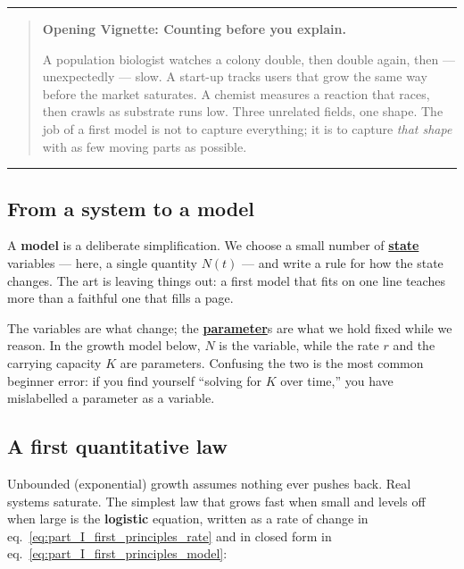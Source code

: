 \documentclass[
]{article}
\theoremstyle{plain}
\theoremstyle{definition}
\begin{document}
\begin{center}\rule{0.5\linewidth}{0.5pt}\end{center}

\begin{quote}
\textbf{Opening Vignette: Counting before you explain.}

A population biologist watches a colony double, then double again, then
--- unexpectedly --- slow. A start-up tracks users that grow the same
way before the market saturates. A chemist measures a reaction that
races, then crawls as substrate runs low. Three unrelated fields, one
shape. The job of a first model is not to capture everything; it is to
capture \emph{that shape} with as few moving parts as possible.
\end{quote}

\begin{center}\rule{0.5\linewidth}{0.5pt}\end{center}

\subsection{From a system to a model}\label{from-a-system-to-a-model}

A \textbf{model} is a deliberate simplification. We choose a small
number of \hyperref[gl:state]{\textbf{state}} variables --- here, a
single quantity \(N(t)\) --- and write a rule for how the state changes.
The art is leaving things out: a first model that fits on one line
teaches more than a faithful one that fills a page.

The variables are what change; the
\hyperref[gl:parameter]{\textbf{parameter}}s are what we hold fixed
while we reason. In the growth model below, \(N\) is the variable, while
the rate \(r\) and the carrying capacity \(K\) are parameters. Confusing
the two is the most common beginner error: if you find yourself
``solving for \(K\) over time,'' you have mislabelled a parameter as a
variable.

\subsection{A first quantitative law}\label{a-first-quantitative-law}

Unbounded (exponential) growth assumes nothing ever pushes back. Real
systems saturate. The simplest law that grows fast when small and levels
off when large is the \textbf{logistic} equation, written as a rate of
change in eq.~\ref{eq:part_I_first_principles_rate} and in closed form
in eq.~\ref{eq:part_I_first_principles_model}:
\end{document}
